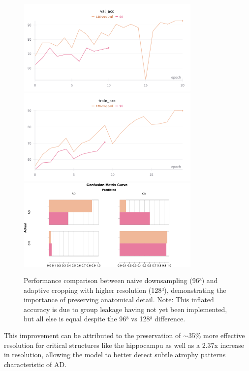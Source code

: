 \documentclass[12pt, a4paper]{article}
\begin{document}
\begin{figure}[htbp]
  \centering
  \includegraphics[width=0.8\textwidth]{figures/crop_val_acc.png}
  \includegraphics[width=0.8\textwidth]{figures/crop_train_acc.png}
  \includegraphics[width=0.8\textwidth]{figures/crop_CM.png}
  \caption{Performance comparison between naive downsampling (96³) and adaptive cropping with higher resolution (128³), demonstrating the importance of preserving anatomical detail. Note: This inflated accuracy is due to group leakage having not yet been implemented, but all else is equal despite the 96³ vs 128³ difference.}
  \label{fig:cropping_impact}
\end{figure}

This improvement can be attributed to the preservation of $\sim$35\% more effective resolution for critical structures like the hippocampu as well as a 2.37x increase in resolution, allowing the model to better detect subtle atrophy patterns characteristic of AD.
\end{document}
